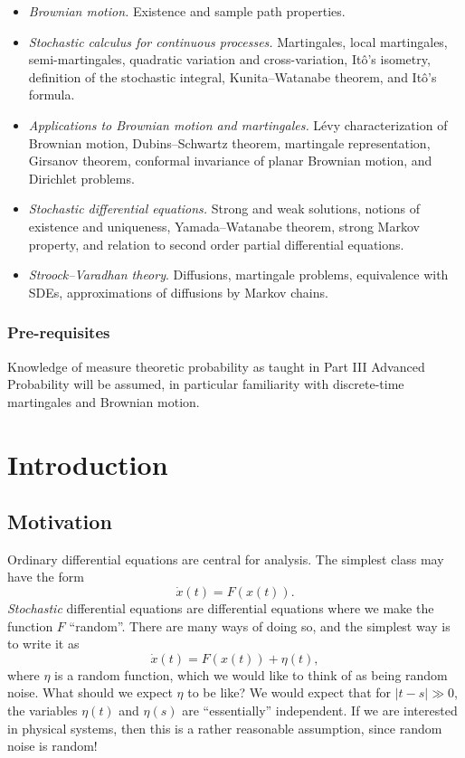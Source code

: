\documentclass[a4paper]{article}
\begin{document}
\maketitle
{\small
\setlength{\parindent}{0em}
\setlength{\parskip}{1em}
\begin{itemize}
  \item \textit{Brownian motion.} Existence and sample path properties.
  \item \textit{Stochastic calculus for continuous processes.} Martingales, local martingales, semi-martingales, quadratic variation and cross-variation, It\^o's isometry, definition of the stochastic integral, Kunita--Watanabe theorem, and It\^o's formula.
  \item \textit{Applications to Brownian motion and martingales.} L\'evy characterization of Brownian motion, Dubins--Schwartz theorem, martingale representation, Girsanov theorem, conformal invariance of planar Brownian motion, and Dirichlet problems.
  \item \textit{Stochastic differential equations.} Strong and weak solutions, notions of existence and uniqueness, Yamada--Watanabe theorem, strong Markov property, and relation to second order partial differential equations.
  \item \textit{Stroock--Varadhan theory}. Diffusions, martingale problems, equivalence with SDEs, approximations of diffusions by Markov chains.
\end{itemize}
\subsubsection*{Pre-requisites}
Knowledge of measure theoretic probability as taught in Part III Advanced Probability will be assumed, in particular familiarity with discrete-time martingales and Brownian motion.
}
\tableofcontents

\section{Introduction}
\subsection{Motivation}
Ordinary differential equations are central for analysis. The simplest class may have the form
\[
  \dot{x}(t) = F(x(t)).
\]
\emph{Stochastic} differential equations are differential equations where we make the function $F$ ``random''. There are many ways of doing so, and the simplest way is to write it as
\[
  \dot{x}(t) = F(x(t)) + \eta(t),
\]
where $\eta$ is a random function, which we would like to think of as being random noise. What should we expect $\eta$ to be like? We would expect that for $|t - s| \gg 0$, the variables $\eta(t)$ and $\eta(s)$ are ``essentially'' independent. If we are interested in physical systems, then this is a rather reasonable assumption, since random noise is random!
\end{document}
